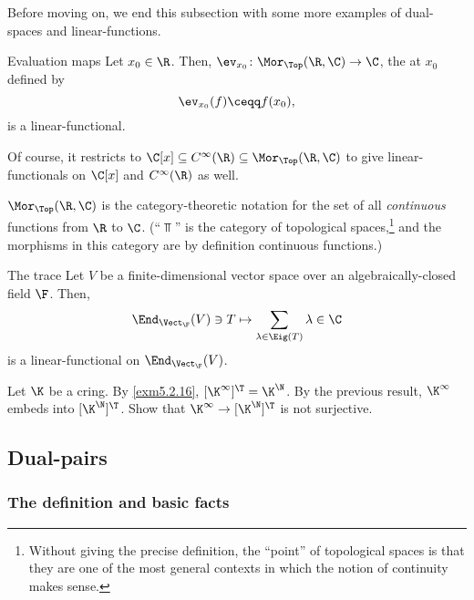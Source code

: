 Before moving on, we end this subsection with some more examples of dual-spaces and linear-functions.
\begin{exm}{Evaluation maps}{}
	Let $x_0\in \R$.  Then, $\ev _{x_0}\colon \Mor _{\Top}(\R ,\C )\rightarrow \C$, the  at $x_0$ defined by
	\begin{equation}
	\ev _{x_0}(f)\ceqq f(x_0),
	\end{equation}
	is a linear-functional.
	
	Of course, it restricts to $\C [x]\subseteq C^{\infty}(\R )\subseteq \Mor _{\Top}(\R ,\C )$ to give linear-functionals on $\C [x]$ and $C^{\infty}(\R )$ as well.
	\begin{rmk}
		$\Mor _{\Top}(\R ,\C )$ is the category-theoretic notation for the set of all \emph{continuous} functions from $\R$ to $\C$.  (``$\Top$'' is the category of topological spaces,\footnote{Without giving the precise definition, the ``point'' of topological spaces is that they are one of the most general contexts in which the notion of continuity makes sense.} and the morphisms in this category are by definition continuous functions.)
	\end{rmk}
\end{exm}
\begin{exm}{The trace}{}
	Let $V$ be a finite-dimensional vector space over an algebraically-closed field $\F$.  Then,
	\begin{equation}
	\End _{\Vect _{\F}}(V)\ni T\mapsto \sum _{\lambda \in \Eig (T)}\lambda \in \C
	\end{equation}
	is a linear-functional on $\End _{\Vect _{\F}}(V)$.
\end{exm}
\begin{exr}{}{}
	Let $\K$ be a cring.  By \cref{exm5.2.16}, $[\K ^{\infty}]^{\T}=\K ^{\N}$.  By the previous result, $\K ^{\infty}$ embeds into $[\K ^{\N}]^{\T}$.  Show that $\K ^{\infty}\rightarrow [\K ^{\N}]^{\T}$ is not surjective.
\end{exr}

\subsection{Dual-pairs}

\subsubsection{The definition and basic facts}

